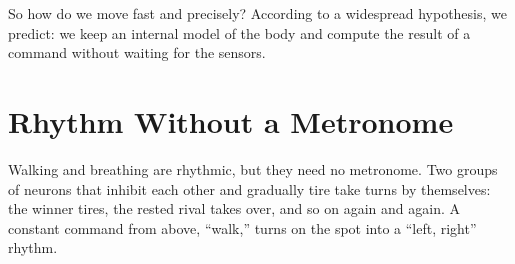 So how do we move fast and precisely? According to a widespread hypothesis, we predict: we keep an internal model of the body and compute the result of a command without waiting for the sensors.

\section*{Rhythm Without a Metronome}

Walking and breathing are rhythmic, but they need no metronome. Two groups of neurons that inhibit each other and gradually tire take turns by themselves: the winner tires, the rested rival takes over, and so on again and again. A constant command from above, ``walk,'' turns on the spot into a ``left, right'' rhythm.

